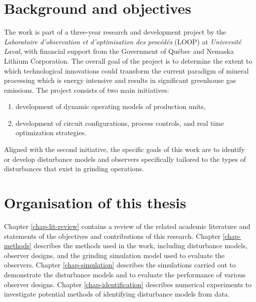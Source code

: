 
\section*{Background and objectives}

The work is part of a three-year research and development project by the \textit{Laboratoire d’observation et d’optimisation des procédés} (LOOP) at \textit{Universit\'e Laval}, with financial support from the Government of Qu\'ebec and Nemaska Lithium Corporation. The overall goal of the project is to determine the extent to which technological innovations could transform the current paradigm of mineral processing which is energy intensive and results in significant greenhouse gas emissions. The project consists of two main initiatives:

\begin{enumerate}
	\item development of dynamic operating models of production units,
	\item development of circuit configurations, process controls, and real time optimization strategies.
\end{enumerate}

Aligned with the second initiative, the specific goals of this work are to identify or develop disturbance models and observers specifically tailored to the types of disturbances that exist in grinding operations.

\section*{Organisation of this thesis}

Chapter \ref{chap-lit-review} contains a review of the related academic literature and statements of the objectives and contributions of this research. Chapter \ref{chap-methods} describes the methods used in the work, including disturbance models, observer designs, and the grinding simulation model used to evaluate the observers. Chapter \ref{chap-simulation} describes the simulations carried out to demonstrate the disturbance models and to evaluate the performance of various observer designs. Chapter \ref{chap-identification} describes numerical experiments to investigate potential methods of identifying disturbance models from data.

